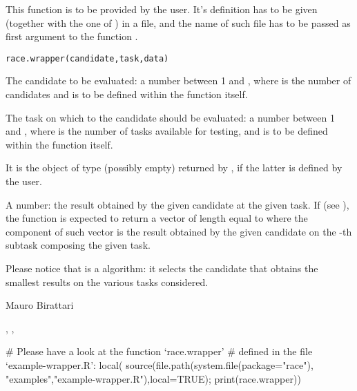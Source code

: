 \begin{Description}\relax
This function is to be provided by the user. It's
definition has to be given (together with the one of )
in a file, and the name of such file has to
be passed as first argument to the function .
\end{Description}
\begin{Usage}
\begin{verbatim}race.wrapper(candidate,task,data)\end{verbatim}
\end{Usage}
\begin{Arguments}
\begin{ldescription}
\item[\code{candidate}] The candidate to be evaluated: a number between 1 and
, where  is the number of
candidates and is to be defined within the function
 itself.
\item[\code{task}] The task on which to the candidate should be evaluated: a
number between 1 and , where  is the
number of tasks available for testing, and is to be defined within
the function  itself.
\item[\code{data}] It is the object of type  (possibly empty)
returned by , if the latter is defined by the
user.
\end{ldescription}
\end{Arguments}
\begin{Value}
A number: the result obtained by the given candidate at the given
task. If  (see ), the
function is expected to return a vector of length equal to
 where the component  of such vector is the
result obtained by the given candidate on the -th subtask
composing the given task.
\end{Value}
\begin{Note}\relax
Please notice that  is a  algorithm:
it selects the candidate that obtains the smallest results on
the various tasks considered.
\end{Note}
\begin{Author}\relax
Mauro Birattari
\end{Author}
\begin{SeeAlso}\relax
{}, ,
\end{SeeAlso}
\begin{Examples}
\begin{ExampleCode}
# Please have a look at the function `race.wrapper'
# defined in the file `example-wrapper.R':
local({
  source(file.path(system.file(package="race"),
                           "examples","example-wrapper.R"),local=TRUE);
  print(race.wrapper)})
\end{ExampleCode}
\end{Examples}

